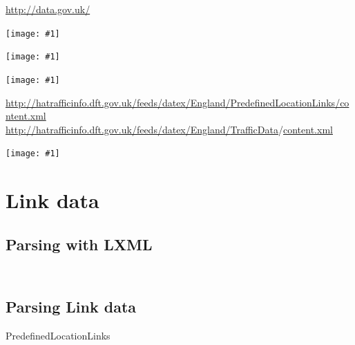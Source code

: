 \documentclass[aspectratio=169]{beamer}
\newcommand{\alerturl}[1]{\alert{\url{#1}}}
\newcommand{\tallimage}[1]{%
  \begin{frame}
    \centering
    \texttt{[image: \#1]}
    \\
  \end{frame}
}
\newcommand{\wideimage}[1]{%
  \begin{frame}
    \centering
    \texttt{[image: \#1]}
    \\
  \end{frame}
}
\begin{document}
\begin{frame}
  \Huge\centering
  \url{http://data.gov.uk/}
  \\
\end{frame}

\tallimage{img/data-gov-uk.png}
\tallimage{img/data-page.png}
\wideimage{img/data-page-crop.png}

\begin{frame}
  \Large\centering
  \url{http://hatrafficinfo.dft.gov.uk/feeds/datex/England/}\alerturl{PredefinedLocationLinks}\url{/content.xml}
  \\
  \vspace{1\baselineskip}
  \url{http://hatrafficinfo.dft.gov.uk/feeds/datex/England/}\alerturl{TrafficData}/\url{content.xml}
  \\
\end{frame}

\tallimage{img/datex2.png}

\section{Link data}

\subsection{Parsing with LXML}
\begin{frame}
  \inputminted{xml}{document.xml}
  \vspace{\baselineskip}
  \inputminted{python}{lxml_objectify.py}
\end{frame}

\subsection{Parsing Link data}
\begin{frame}
  \centering\Huge
  PredefinedLocationLinks
  \\
\end{frame}

\begin{frame}
  \inputminted{xml}{PredefinedLocationLinks/structure.xml}
\end{frame}

\begin{frame}
  \inputminted{xml}{PredefinedLocationLinks/location.xml}
\end{frame}

\begin{frame}
  \inputminted{python}{PredefinedLocationLinks/structure.py}
\end{frame}
\end{document}
